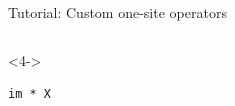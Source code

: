 \begin{frame}[fragile]{Tutorial: Custom one-site operators}
\begin{columns}
\begin{column}{4.5cm}
\begin{onlyenv}<4->
\begin{lstlisting}[language=JuliaLocal, style=julia, basicstyle=\small]
im * X
\end{lstlisting}
\end{onlyenv}

\end{column}

\end{columns}

\end{frame}
